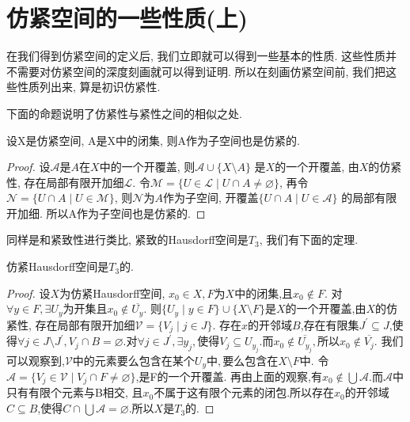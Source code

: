 \chapter{仿紧空间的一些性质(上)}
\label{chap02}

在我们得到仿紧空间的定义后, 我们立即就可以得到一些基本的性质.
这些性质并不需要对仿紧空间的深度刻画就可以得到证明.
所以在刻画仿紧空间前, 我们把这些性质列出来, 算是初识仿紧性.

下面的命题说明了仿紧性与紧性之间的相似之处.

\begin{proposition}
  设X是仿紧空间, A是X中的闭集, 则A作为子空间也是仿紧的.
\end{proposition}
\begin{proof}
  设$\mathscr{A}$是$A$在$X$中的一个开覆盖, 则$\mathscr{A} \cup \{ X \setminus A \}$
  是$X$的一个开覆盖, 由$X$的仿紧性, 存在局部有限开加细$\mathscr{L}$.
  令$\mathscr{M} = \{ U \in \mathscr{L} \mid U \cap A \neq \varnothing \}$,
  再令$\mathscr{N} = \{ U \cap A \mid U \in \mathscr{M} \}$,
  则$\mathscr{N}$为$A$作为子空间, 开覆盖$\{ U \cap A \mid U \in \mathscr{A} \}$
  的局部有限开加细. 所以A作为子空间也是仿紧的.
\end{proof}

同样是和紧致性进行类比, 紧致的Hausdorff空间是$T_3$, 我们有下面的定理.

\begin{thm} \label{thm:paracompact T2}
  仿紧Hausdorff空间是$T_3$的.
\end{thm}
\begin{proof}
  设$X$为仿紧Hausdorff空间, $x_0 \in X, F$为$X$中的闭集,且$x_0 \notin F$.
  对$\forall y \in F, \exists U_y \text{为开集且} x_0 \notin \overline{U_y}.$
  则$\{ U_y \mid y \in F\} \cup \{ X \setminus F \}$是$X$的一个开覆盖,由$X$的仿紧性,
  存在局部有限开加细$\mathscr{V} = \{ V_j \mid j \in J \}$.
  存在$x$的开邻域$B$,存在有限集$J^{'} \subseteq J$,使得$\forall j \in J \setminus J^{'},
  V_j \cap B = \varnothing$.对$\forall j \in J^{'}, \exists y_j, \text{使得}
  V_j \subseteq U_{y_j}$.而$x_0 \notin \overline{U_{y_j}}, \text{所以} x_0 \notin \overline{V_j}$.
  我们可以观察到,$\mathscr{V}\text{中的元素要么包含在某个}U_y\text{中},\text{要么包含在} X \setminus F$中.
  令$\mathscr{A} = \{ V_j \in \mathscr{V} \mid V_j \cap F \neq \varnothing \}$,是F的一个开覆盖.
  再由上面的观察,有$x_0 \notin \bigcup \mathscr{A}$.而$\mathscr{A}$中只有有限个元素与B相交,
  且$x_0$不属于这有限个元素的闭包.所以存在$x_0$的开邻域$C \subseteq B$,使得$C \cap \bigcup \mathscr{A}
  = \varnothing$.所以$X$是$T_3$的.
\end{proof}

